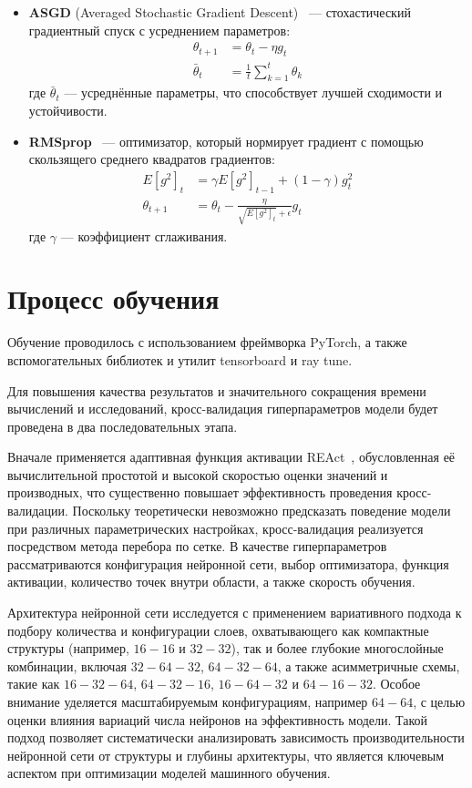 \begin{itemize}
    \item \textbf{ASGD} (Averaged Stochastic Gradient Descent)~\cite{polyak1992acceleration} --- стохастический градиентный спуск с усреднением параметров:
    \[
    \begin{aligned}
        \theta_{t+1} &= \theta_t - \eta g_t \\
        \bar{\theta}_t &= \frac{1}{t} \sum_{k=1}^{t} \theta_k
    \end{aligned}
    \]
    где $\bar{\theta}_t$ --- усреднённые параметры, что способствует лучшей сходимости и устойчивости.

    \item \textbf{RMSprop}~\cite{tieleman2012lecture} --- оптимизатор, который нормирует градиент с помощью скользящего среднего квадратов градиентов:
    \[
    \begin{aligned}
        E[g^2]_t &= \gamma E[g^2]_{t-1} + (1 - \gamma) g_t^2 \\
        \theta_{t+1} &= \theta_t - \frac{\eta}{\sqrt{E[g^2]_t} + \epsilon} g_t
    \end{aligned}
    \]
    где $\gamma$ --- коэффициент сглаживания.
\end{itemize}

\section{Процесс обучения}
Обучение проводилось с использованием фреймворка PyTorch, а также вспомогательных
библиотек и утилит tensorboard и ray tune.

Для повышения качества результатов и значительного сокращения времени вычислений и
исследований, кросс-валидация гиперпараметров модели будет проведена в два
последовательных этапа.

Вначале применяется адаптивная функция активации
REAct~\cite{0d752c79fb816703274a3d37f85a85689a2a9405}, обусловленная её вычислительной
простотой и высокой скоростью оценки значений и производных, что существенно
повышает эффективность проведения кросс-валидации. Поскольку теоретически
невозможно предсказать поведение модели при различных параметрических настройках,
кросс-валидация реализуется посредством метода перебора по сетке. В качестве
гиперпараметров рассматриваются конфигурация нейронной сети, выбор оптимизатора,
функция активации, количество точек внутри области, а также скорость обучения.


Архитектура нейронной сети исследуется с применением вариативного подхода к
подбору количества и конфигурации слоев, охватывающего как компактные структуры
(например, $16-16$ и $32-32$), так и более глубокие многослойные комбинации,
включая $32-64-32$, $64-32-64$, а также асимметричные схемы, такие как
$16-32-64$, $64-32-16$, $16-64-32$ и $64-16-32$. Особое внимание уделяется
масштабируемым конфигурациям, например $64-64$, с целью оценки влияния
вариаций числа нейронов на эффективность модели. Такой подход позволяет
систематически анализировать зависимость производительности нейронной сети
от структуры и глубины архитектуры, что является ключевым аспектом при
оптимизации моделей машинного обучения.

